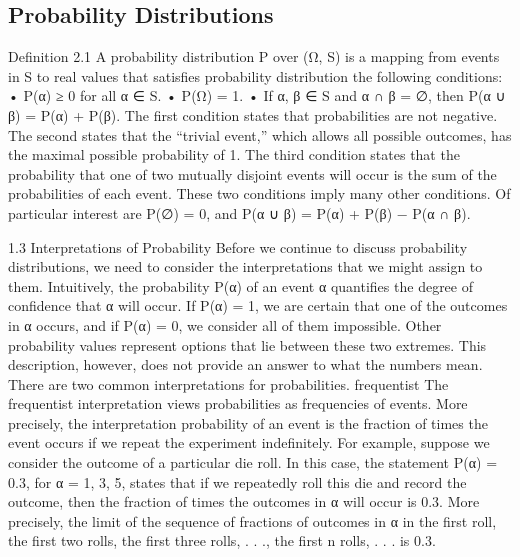 \subsection{Probability Distributions}

Definition 2.1 A probability distribution P over (Ω, S) is a mapping from events in S to real values that satisfies probability distribution the following conditions: • P(α) ≥ 0 for all α ∈ S. • P(Ω) = 1. • If α, β ∈ S and α ∩ β = ∅, then P(α ∪ β) = P(α) + P(β). The first condition states that probabilities are not negative. The second states that the “trivial event,” which allows all possible outcomes, has the maximal possible probability of 1. The third condition states that the probability that one of two mutually disjoint events will occur is the sum of the probabilities of each event. These two conditions imply many other conditions. Of particular interest are P(∅) = 0, and P(α ∪ β) = P(α) + P(β) − P(α ∩ β).


1.3 Interpretations of Probability
Before we continue to discuss probability distributions, we need to consider the interpretations that we might assign to them. Intuitively, the probability P(α) of an event α quantifies the degree of confidence that α will occur. If P(α) = 1, we are certain that one of the outcomes in α occurs, and if P(α) = 0, we consider all of them impossible. Other probability values represent options that lie between these two extremes. This description, however, does not provide an answer to what the numbers mean. There are two common interpretations for probabilities. frequentist The frequentist interpretation views probabilities as frequencies of events. More precisely, the interpretation probability of an event is the fraction of times the event occurs if we repeat the experiment indefinitely. For example, suppose we consider the outcome of a particular die roll. In this case, the statement P(α) = 0.3, for α = {1, 3, 5}, states that if we repeatedly roll this die and record the outcome, then the fraction of times the outcomes in α will occur is 0.3. More precisely, the limit of the sequence of fractions of outcomes in α in the first roll, the first two rolls, the first three rolls, . . ., the first n rolls, . . . is 0.3.

